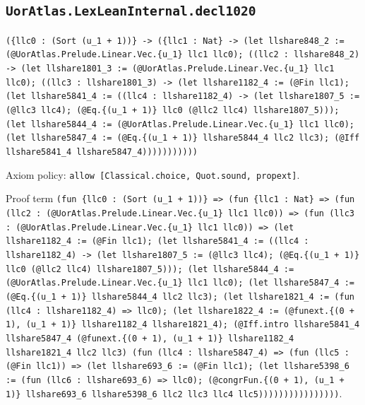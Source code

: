 \documentclass[11pt]{article}
\begin{document}
\subsection*{\texttt{UorAtlas.LexLeanInternal.decl1020}}
\noindent\texttt{(\{llc0 : (Sort (u\_1 + 1))\} -> (\{llc1 : Nat\} -> (let llshare848\_2 := (@UorAtlas.Prelude.Linear.Vec.\{u\_1\} llc1 llc0); ((llc2 : llshare848\_2) -> (let llshare1801\_3 := (@UorAtlas.Prelude.Linear.Vec.\{u\_1\} llc1 llc0); ((llc3 : llshare1801\_3) -> (let llshare1182\_4 := (@Fin llc1); (let llshare5841\_4 := ((llc4 : llshare1182\_4) -> (let llshare1807\_5 := (@llc3 llc4); (@Eq.\{(u\_1 + 1)\} llc0 (@llc2 llc4) llshare1807\_5))); (let llshare5844\_4 := (@UorAtlas.Prelude.Linear.Vec.\{u\_1\} llc1 llc0); (let llshare5847\_4 := (@Eq.\{(u\_1 + 1)\} llshare5844\_4 llc2 llc3); (@Iff llshare5841\_4 llshare5847\_4)))))))))))}\par
\noindent Axiom policy: \texttt{allow [Classical.choice, Quot.sound, propext]}.\par
\noindent Proof term \texttt{(fun \{llc0 : (Sort (u\_1 + 1))\} => (fun \{llc1 : Nat\} => (fun (llc2 : (@UorAtlas.Prelude.Linear.Vec.\{u\_1\} llc1 llc0)) => (fun (llc3 : (@UorAtlas.Prelude.Linear.Vec.\{u\_1\} llc1 llc0)) => (let llshare1182\_4 := (@Fin llc1); (let llshare5841\_4 := ((llc4 : llshare1182\_4) -> (let llshare1807\_5 := (@llc3 llc4); (@Eq.\{(u\_1 + 1)\} llc0 (@llc2 llc4) llshare1807\_5))); (let llshare5844\_4 := (@UorAtlas.Prelude.Linear.Vec.\{u\_1\} llc1 llc0); (let llshare5847\_4 := (@Eq.\{(u\_1 + 1)\} llshare5844\_4 llc2 llc3); (let llshare1821\_4 := (fun (llc4 : llshare1182\_4) => llc0); (let llshare1822\_4 := (@funext.\{(0 + 1), (u\_1 + 1)\} llshare1182\_4 llshare1821\_4); (@Iff.intro llshare5841\_4 llshare5847\_4 (@funext.\{(0 + 1), (u\_1 + 1)\} llshare1182\_4 llshare1821\_4 llc2 llc3) (fun (llc4 : llshare5847\_4) => (fun (llc5 : (@Fin llc1)) => (let llshare693\_6 := (@Fin llc1); (let llshare5398\_6 := (fun (llc6 : llshare693\_6) => llc0); (@congrFun.\{(0 + 1), (u\_1 + 1)\} llshare693\_6 llshare5398\_6 llc2 llc3 llc4 llc5))))))))))))))))}.\par
\end{document}
